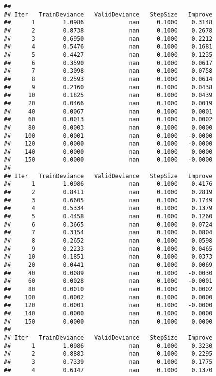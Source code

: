\documentclass[
]{article}
\begin{document}
\begin{verbatim}
## 
## Iter   TrainDeviance   ValidDeviance   StepSize   Improve
##      1        1.0986             nan     0.1000    0.3148
##      2        0.8738             nan     0.1000    0.2678
##      3        0.6950             nan     0.1000    0.2212
##      4        0.5476             nan     0.1000    0.1681
##      5        0.4427             nan     0.1000    0.1235
##      6        0.3590             nan     0.1000    0.0617
##      7        0.3098             nan     0.1000    0.0758
##      8        0.2593             nan     0.1000    0.0614
##      9        0.2160             nan     0.1000    0.0438
##     10        0.1825             nan     0.1000    0.0439
##     20        0.0466             nan     0.1000    0.0019
##     40        0.0067             nan     0.1000    0.0001
##     60        0.0013             nan     0.1000    0.0002
##     80        0.0003             nan     0.1000    0.0000
##    100        0.0001             nan     0.1000   -0.0000
##    120        0.0000             nan     0.1000   -0.0000
##    140        0.0000             nan     0.1000    0.0000
##    150        0.0000             nan     0.1000   -0.0000
## 
## Iter   TrainDeviance   ValidDeviance   StepSize   Improve
##      1        1.0986             nan     0.1000    0.4176
##      2        0.8411             nan     0.1000    0.2819
##      3        0.6605             nan     0.1000    0.1749
##      4        0.5334             nan     0.1000    0.1379
##      5        0.4458             nan     0.1000    0.1260
##      6        0.3665             nan     0.1000    0.0724
##      7        0.3154             nan     0.1000    0.0804
##      8        0.2652             nan     0.1000    0.0598
##      9        0.2233             nan     0.1000    0.0465
##     10        0.1851             nan     0.1000    0.0373
##     20        0.0441             nan     0.1000    0.0069
##     40        0.0089             nan     0.1000   -0.0030
##     60        0.0028             nan     0.1000   -0.0001
##     80        0.0010             nan     0.1000    0.0002
##    100        0.0002             nan     0.1000    0.0000
##    120        0.0001             nan     0.1000   -0.0000
##    140        0.0000             nan     0.1000    0.0000
##    150        0.0000             nan     0.1000    0.0000
## 
## Iter   TrainDeviance   ValidDeviance   StepSize   Improve
##      1        1.0986             nan     0.1000    0.3230
##      2        0.8883             nan     0.1000    0.2295
##      3        0.7339             nan     0.1000    0.1775
##      4        0.6147             nan     0.1000    0.1370

\end{verbatim}
\end{document}

